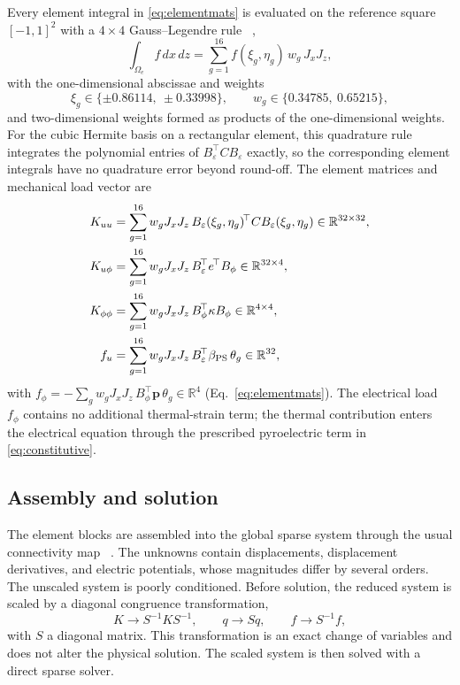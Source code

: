 \documentclass[a4paper,12pt]{elsarticle}
\begin{document}
Every element integral in \eqref{eq:elementmats} is evaluated on the reference square
$[-1,1]^2$ with a $4\times4$ Gauss--Legendre rule
~\cite{AbramowitzStegun1965,Gautschi2004},
\begin{equation}
\int_{\Omega_e}f\,dx\,dz
=\sum_{g=1}^{16}f(\xi_g,\eta_g)\,w_g\,J_xJ_z,
\label{eq:quad}
\end{equation}
with the one-dimensional abscissae and weights
\begin{equation}
\xi_g\in\{\pm0.86114,\ \pm0.33998\},\qquad
w_g\in\{0.34785,\ 0.65215\},
\label{eq:gaussweights}
\end{equation}
and two-dimensional weights formed as products of the one-dimensional weights.
For the cubic Hermite basis on a rectangular element, this quadrature rule integrates
the polynomial entries of $B_\varepsilon^{\!\top}CB_\varepsilon$ exactly, so the
corresponding element integrals have no quadrature error beyond round-off. The
element matrices and mechanical load vector are
\begin{align}
K_{uu}
&=\sum_{g=1}^{16}w_gJ_xJ_z\,
B_\varepsilon(\xi_g,\eta_g)^{\!\top}C
B_\varepsilon(\xi_g,\eta_g)
\in\mathbb{R}^{32\times32},
\notag\\
K_{u\phi}
&=\sum_{g=1}^{16}w_gJ_xJ_z\,
B_\varepsilon^{\!\top}e^{\!\top}B_\phi
\in\mathbb{R}^{32\times4},
\notag\\
K_{\phi\phi}
&=\sum_{g=1}^{16}w_gJ_xJ_z\,
B_\phi^{\!\top}\kappa B_\phi
\in\mathbb{R}^{4\times4},
\notag\\
f_u
&=\sum_{g=1}^{16}w_gJ_xJ_z\,
B_\varepsilon^{\!\top}\beta_{\mathrm{PS}}\,\theta_g
\in\mathbb{R}^{32},
\label{eq:elemsums}
\end{align}
with
$f_\phi=-\sum_g w_gJ_xJ_z\,B_\phi^{\!\top}\bm p\,\theta_g\in\mathbb{R}^4$
(Eq.~\eqref{eq:elementmats}). The electrical load $f_\phi$ contains no additional
thermal-strain term; the thermal contribution enters the electrical equation through
the prescribed pyroelectric term in \eqref{eq:constitutive}.

\subsection{Assembly and solution}
\label{sec:assembly}

The element blocks are assembled into the global sparse system through the usual
connectivity map ~\cite{Bathe1996}. The unknowns contain displacements, displacement
derivatives, and electric potentials, whose magnitudes differ by several orders.
The unscaled system is poorly conditioned. Before solution, the
reduced system is scaled by a diagonal congruence transformation,
\[
K\to S^{-1}KS^{-1},\qquad
q\to Sq,\qquad
f\to S^{-1}f,
\]
with $S$ a diagonal matrix. This transformation is an exact change of variables and
does not alter the physical solution. The scaled system is then solved with a direct
sparse solver.
\end{document}

